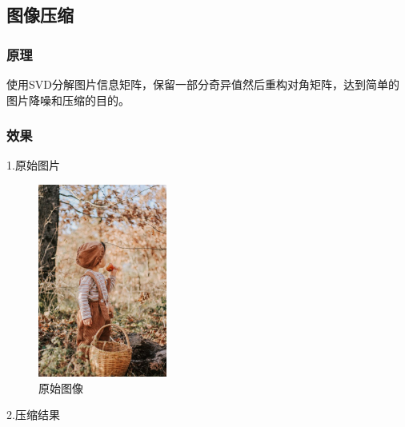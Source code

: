 \documentclass{ctexrep}
\begin{document}
\subsection{图像压缩}

\subsubsection{原理}
使用SVD分解图片信息矩阵，保留一部分奇异值然后重构对角矩阵，达到简单的图片降噪和压缩的目的。
\subsubsection{效果}

1.原始图片  
\begin{figure}[h]
	\centering
	\includegraphics[width=120pt]{figures/boy.jpeg}
	\caption{原始图像}
	\label{fig:1}
\end{figure}

2.压缩结果
\end{document}
